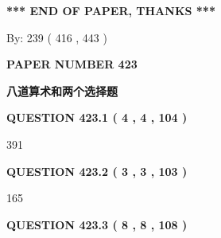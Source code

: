 \documentclass{ctexart}
\begin{document}
 
 
 
   
   
 \vspace{0.2in}
 
   
   
   
   
\vspace{1.0in} 
{\textbf{\large{ *** END OF PAPER, THANKS *** }}} 
   
   
\hspace{1.0in} By: 
 239 ( 416 ,  443 )
   
   
   
   
\newpage 
\setcounter{page}{ 
   423001 } 
   
   
   
   
 {\textbf{ \Large{ PAPER NUMBER  423  }}}
   
   
\vspace{0.2in}
   
   
   
   
   
   
 \vspace{0.2in}
{\LARGE {\textbf{ 八道算术和两个选择题}}}
   
   
  
\vspace{0.2in}
  
{\textbf{\Large{QUESTION
423.1 
 ( 4 , 4 , 104 )
}}}
  
  
 
 
\noindent{}

391
 
 
  
\vspace{0.2in}
  
{\textbf{\Large{QUESTION
423.2 
 ( 3 , 3 , 103 )
}}}
  
  
 
 
\noindent{}

165
 
 
  
\vspace{0.2in}
  
{\textbf{\Large{QUESTION
423.3 
 ( 8 , 8 , 108 )
}}}
  
  
 
 
\noindent{}
\end{document}

